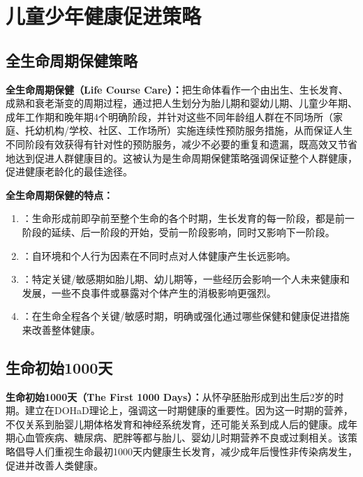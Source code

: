 \section{儿童少年健康促进策略}
\label{sec:promotion-strategies}

\subsection{全生命周期保健策略}

\begin{keybox}
\textbf{全生命周期保健（Life Course Care）：}把生命体看作一个由出生、生长发育、成熟和衰老渐变的周期过程，通过把人生划分为胎儿期和婴幼儿期、儿童少年期、成年工作期和晚年期4个明确阶段，并针对这些不同年龄组人群在不同场所（家庭、托幼机构/学校、社区、工作场所）实施连续性预防服务措施，从而保证人生不同阶段有效获得有针对性的预防服务，减少不必要的重复和遗漏，既高效又节省地达到促进人群健康目的。这被认为是生命周期保健策略强调保证整个人群健康，促进健康老龄化的最佳途径。
\end{keybox}

\begin{defbox}
\textbf{全生命周期保健的特点：}

\begin{enumerate}[leftmargin=*]
    \item {}：生命形成前即孕前至整个生命的各个时期，生长发育的每一阶段，都是前一阶段的延续、后一阶段的开始，受前一阶段影响，同时又影响下一阶段。
    \item {}：自环境和个人行为因素在不同时点对人体健康产生长远影响。
    \item {}：特定关键/敏感期如胎儿期、幼儿期等，一些经历会影响一个人未来健康和发展，一些不良事件或暴露对个体产生的消极影响更强烈。
    \item {}：在生命全程各个关键/敏感时期，明确或强化通过哪些保健和健康促进措施来改善整体健康。
\end{enumerate}
\end{defbox}

\subsection{生命初始1000天}

\begin{keybox}
\textbf{生命初始1000天（The First 1000 Days）：}从怀孕胚胎形成到出生后2岁的时期。建立在DOHaD理论上，强调这一时期健康的重要性。因为这一时期的营养，不仅关系到胎婴儿期体格发育和神经系统发育，还可能关系到成人后的健康。成年期心血管疾病、糖尿病、肥胖等都与胎儿、婴幼儿时期营养不良或过剩相关。该策略倡导人们重视生命最初1000天内健康生长发育，减少成年后慢性非传染病发生，促进并改善人类健康。
\end{keybox}

